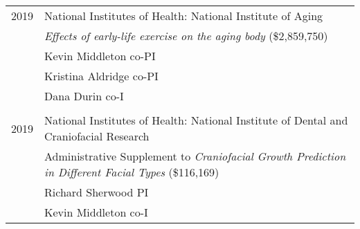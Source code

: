 \begin{longtable}{@{}lX@{}}
    2019 & National Institutes of Health: National Institute of Aging\\
         & \emph{Effects of early-life exercise on the aging body} (\$2,859,750)\\
         & Kevin Middleton co-PI\\
         & Kristina Aldridge co-PI\\
         & Dana Durin co-I\\[0.5pc]
    \\
    2019 & National Institutes of Health: National Institute of Dental and Craniofacial Research\\
         & Administrative Supplement to \emph{Craniofacial Growth Prediction in Different Facial Types} (\$116,169)\\
         & Richard Sherwood PI\\
         & Kevin Middleton co-I\\[0.5pc]
\end{longtable}
